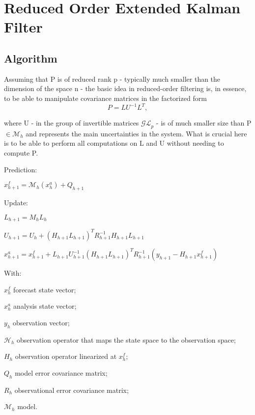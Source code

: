 \documentclass{tufte-book}
\begin{document}
 \hypertarget{reduced_order_extended_kalman_filter}{}\section{\-Reduced Order Extended Kalman Filter}\label{reduced_order_extended_kalman_filter}


\hypertarget{reduced_order_extended_kalman_filter_algorithm16}{}\subsection{\-Algorithm}\label{reduced_order_extended_kalman_filter_algorithm16}


\-Assuming that \-P is of reduced rank p - typically much smaller than the dimension of the space n - the basic idea in reduced-\/order filtering is, in essence, to be able to manipulate covariance matrices in the factorized form \[ P = LU^{-1}L^{T}, \]

where \-U - in the group of invertible matrices $\mathcal{GL}_{p}$ - is of much smaller size than \-P $\in \mathcal{M}_{h}$ and represents the main uncertainties in the system. \-What is crucial here is to be able to perform all computations on \-L and \-U without needing to compute \-P.


\begin{DoxyEnumerate}
\item \-Prediction\-:
\begin{DoxyItemize}
\item $ x_{h+1}^f = \mathcal{M}_{h}(x_{h}^{a}) + Q_{h+1}$\par

\end{DoxyItemize}
\item \-Update\-:
\begin{DoxyItemize}
\item $ L_{h+1} = M_{h}L_h$\par

\item $ U_{h+1} = U_h + (H_{h+1}L_{h+1})^T R_{h+1}^{-1} H_{h+1}L_{h+1}$\par

\item $ x_{h+1}^a = x_{h+1}^f + L_{h+1}U_{h+1}^{-1}(H_{h+1}L_{h+1})^T R_{h+1}^{-1} (y_{h+1}-H_{h+1}x_{h+1}^f)$\par

\end{DoxyItemize}
\end{DoxyEnumerate}\-With\-: \par
 $x_h^f$ forecast state vector; \par
 $x_h^a$ analysis state vector; \par
 $y_h$ observation vector; \par
 $\mathcal{H}_h$ observation operator that maps the state space to the observation space; \par
 $H_h$ observation operator linearized at $x^f_h$; \par
 $Q_h$ model error covariance matrix; \par
 $R_h$ observational error covariance matrix; \par
 $\mathcal{M}_h$ model.
\end{document}
